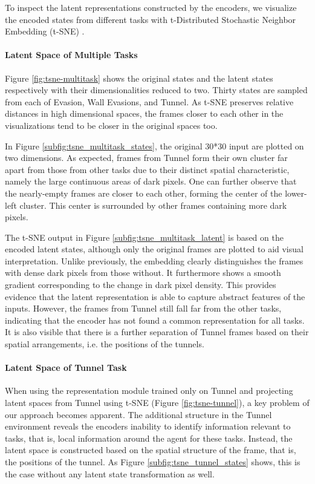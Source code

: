 To inspect the latent representations constructed by the encoders, we visualize the encoded states from different tasks with t-Distributed Stochastic Neighbor Embedding (t-SNE) \citep{tsne}. 

\paragraph{Latent Space of Multiple Tasks}
Figure \ref{fig:tsne-multitask} shows the original states and the latent states respectively with their dimensionalities reduced to two. Thirty states are sampled from each of Evasion, Wall Evasions, and Tunnel. 
As t-SNE preserves relative distances in high dimensional spaces, the frames closer to each other in the visualizations tend to be closer in the original spaces too.

In Figure \ref{subfig:tsne_multitask_states}, the original 30*30 input are plotted on two dimensions.
As expected, frames from Tunnel form their own cluster far apart from those from other tasks due to their distinct spatial characteristic, namely the large continuous areas of dark pixels. One can further observe that the nearly-empty frames are closer to each other, forming the center of the lower-left cluster.
This center is surrounded by other frames containing more dark pixels.

The t-SNE output in Figure \ref{subfig:tsne_multitask_latent} is based on the encoded latent states, although only the original frames are plotted to aid visual interpretation.
Unlike previously, the embedding clearly distinguishes the frames with dense dark pixels from those without. It furthermore shows a smooth gradient corresponding to the change in dark pixel density.
This provides evidence that the latent representation is able to capture abstract features of the inputs.
However, the frames from Tunnel still fall far from the other tasks, indicating that the encoder has not found a common representation for all tasks.
It is also visible that there is a further separation of Tunnel frames based on their spatial arrangements, i.e. the positions of the tunnels.

\paragraph{Latent Space of Tunnel Task} \label{para:latent_tunnel}
When using the representation module trained only on Tunnel and projecting latent spaces from Tunnel using t-SNE (Figure \ref{fig:tsne-tunnel}), a key problem of our approach becomes apparent. 
The additional structure in the Tunnel environment reveals the encoders inability to identify information relevant to tasks, that is, local information around the agent for these tasks. 
Instead, the latent space is constructed based on the spatial structure of the frame, that is, the positions of the tunnel.
As Figure \ref{subfig:tsne_tunnel_states} shows, this is the case without any latent state transformation as well. 

